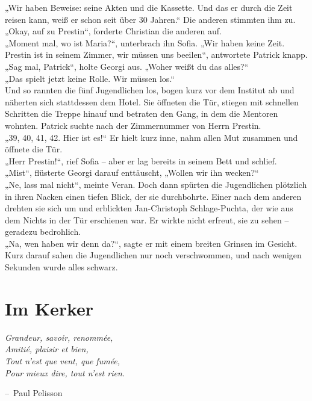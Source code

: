 \documentclass[oneside]{memoir}
\makeatletter
\newenvironment{chapquote}[2][2em]
  {\setlength{\@tempdima}{#1}%
   \def\chapquote@author{#2}%
   \parshape 1 \@tempdima \dimexpr\textwidth-2\@tempdima\relax%
   \itshape}
  {\par\normalfont\hfill--\ \chapquote@author\hspace*{\@tempdima}\par\bigskip}
\makeatother
\begin{document}
„Wir haben Beweise: seine Akten und die Kassette. Und das er durch die Zeit reisen kann, weiß er schon seit über 30 Jahren.“
Die anderen stimmten ihm zu. \\
„Okay, auf zu Prestin“, forderte Christian die anderen auf. \\
„Moment mal, wo ist Maria?“, unterbrach ihn Sofia.
„Wir haben keine Zeit. Prestin ist in seinem Zimmer, wir müssen uns beeilen“, antwortete Patrick knapp. \\
„Sag mal, Patrick“, holte Georgi aus. „Woher weißt du das alles?“ \\
„Das spielt jetzt keine Rolle. Wir müssen los.“ \\
Und so rannten die fünf Jugendlichen los, bogen kurz vor dem Institut ab und näherten sich stattdessen dem Hotel. Sie öffneten die Tür, stiegen mit schnellen Schritten die Treppe hinauf und betraten den Gang, in dem die Mentoren wohnten. Patrick suchte nach der Zimmernummer von Herrn Prestin. \\
„39, 40, 41, 42. Hier ist es!“
Er hielt kurz inne, nahm allen Mut zusammen und öffnete die Tür. \\
„Herr Prestin!“, rief Sofia – aber er lag bereits in seinem Bett und schlief. \\
„Mist“, flüsterte Georgi darauf enttäuscht, „Wollen wir ihn wecken?“ \\
„Ne, lass mal nicht“, meinte Veran.
Doch dann spürten die Jugendlichen plötzlich in ihren Nacken einen tiefen Blick, der sie durchbohrte. Einer nach dem anderen drehten sie sich um und erblickten Jan-Christoph Schlage-Puchta, der wie aus dem Nichts in der Tür erschienen war. Er wirkte nicht erfreut, sie zu sehen – geradezu bedrohlich. \\
„Na, wen haben wir denn da?“, sagte er mit einem breiten Grinsen im Gesicht. Kurz darauf sahen die Jugendlichen nur noch verschwommen, und nach wenigen Sekunden wurde alles schwarz.

     
     
\chapter{Im Kerker} %
\begin{chapquote}{Paul Pelisson}
\glqq Grandeur, savoir, renommée, \\
Amitié, plaisir et bien, \\
Tout n’est que vent, que fumée, \\
Pour mieux dire, tout n’est rien.\grqq
\end{chapquote}
\end{document}
